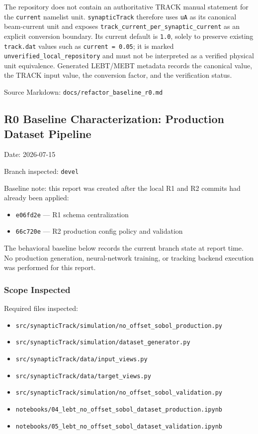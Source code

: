 \documentclass[
]{article}
\providecommand{\tightlist}{%
  \setlength{\itemsep}{0pt}\setlength{\parskip}{0pt}}
\begin{document}
The repository does not contain an authoritative TRACK manual statement
for the \texttt{current} namelist unit. \texttt{synapticTrack} therefore
uses \texttt{uA} as its canonical beam-current unit and exposes
\texttt{track\_current\_per\_synaptic\_current} as an explicit
conversion boundary. Its current default is \texttt{1.0}, solely to
preserve existing \texttt{track.dat} values such as
\texttt{current\ =\ 0.05}; it is marked
\texttt{unverified\_local\_repository} and must not be interpreted as a
verified physical unit equivalence. Generated LEBT/MEBT metadata records
the canonical value, the TRACK input value, the conversion factor, and
the verification status.

Source Markdown: \texttt{docs/refactor\_baseline\_r0.md}

\hypertarget{r0-baseline-characterization-production-dataset-pipeline}{%
\subsection{R0 Baseline Characterization: Production Dataset
Pipeline}\label{r0-baseline-characterization-production-dataset-pipeline}}

Date: 2026-07-15

Branch inspected: \texttt{devel}

Baseline note: this report was created after the local R1 and R2 commits
had already been applied:

\begin{itemize}
\tightlist
\item
  \texttt{e06fd2e} --- R1 schema centralization
\item
  \texttt{66c720e} --- R2 production config policy and validation
\end{itemize}

The behavioral baseline below records the current branch state at report
time. No production generation, neural-network training, or tracking
backend execution was performed for this report.

\hypertarget{scope-inspected}{%
\subsubsection{Scope Inspected}\label{scope-inspected}}

Required files inspected:

\begin{itemize}
\tightlist
\item
  \texttt{src/synapticTrack/simulation/no\_offset\_sobol\_production.py}
\item
  \texttt{src/synapticTrack/simulation/dataset\_generator.py}
\item
  \texttt{src/synapticTrack/data/input\_views.py}
\item
  \texttt{src/synapticTrack/data/target\_views.py}
\item
  \texttt{src/synapticTrack/simulation/no\_offset\_sobol\_validation.py}
\item
  \texttt{notebooks/04\_lebt\_no\_offset\_sobol\_dataset\_production.ipynb}
\item
  \texttt{notebooks/05\_lebt\_no\_offset\_sobol\_dataset\_validation.ipynb}
\end{itemize}
\end{document}
